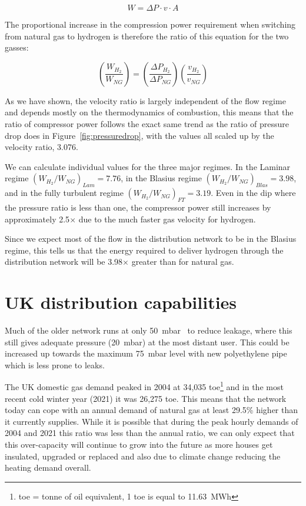 \documentclass[5p]{elsarticle} %
\begin{document}
\begin{equation}
\label{eqn:power}
 W = \Delta P \cdot v \cdot A 
\end{equation}

The proportional increase in the compression power requirement when switching from natural gas to hydrogen is therefore the ratio of this equation for the two gasses:

\begin{equation}
\label{eqn:powerratio}
    \left(\frac{W_{H_2}}{W_{NG}}\right) =
    \left(\frac{\Delta P_{H_2}}{\Delta P_{NG}}\right)
    \left(\frac{v_{H_2}}{v_{NG}}\right)
\end{equation}

As we have shown, the velocity ratio is largely independent of the flow regime and depends mostly on the thermodynamics of combustion, this means that the ratio of compressor power follows the exact same trend as the ratio of pressure drop does in Figure~\ref{fig:pressuredrop}, with the values all scaled up by the velocity ratio, 3.076.

We can calculate individual values for the three major regimes.
In the Laminar regime $(W_{H_2}/W_{NG})_{Lam} = 7.76$, in the Blasius regime $(W_{H_2}/W_{NG})_{Blas} = 3.98$, and in the fully turbulent regime $(W_{H_2}/W_{NG})_{FT} = 3.19$.
Even in the dip where the pressure ratio is less than one, the compressor power still increases by approximately 2.5$\times$ due to the much faster gas velocity for hydrogen.

Since we expect most of the flow in the distribution network to be in the Blasius regime, this tells us that the energy required to deliver hydrogen through the distribution network will be 3.98$\times$ greater than for natural gas.

\section{UK distribution capabilities}
\label{sec:distcapable}

Much of the older network runs at only 50~mbar~\cite{ARUP2023} to reduce leakage, where this still gives adequate pressure (20~mbar) at the most distant user. 
This could be increased up towards the maximum 75~mbar level with new polyethylene pipe which is less prone to leaks\citep{ARUP2023}. 

The UK domestic gas demand\citep{DESNZ2023a} peaked in 2004 at 34,035 toe\footnote{toe = tonne of oil equivalent, 1 toe is equal to 11.63~MWh} and in the most recent cold winter year (2021) it was 26,275 toe. 
This means that the network today can cope with an annual demand of natural gas at least 29.5\% higher than it currently supplies.
While it is possible that during the peak hourly demands of 2004 and 2021 this ratio was less than the annual ratio, we can only expect that this over-capacity will continue to grow into the future as more houses get insulated, upgraded or replaced and also due to climate change reducing the heating demand overall\citep{Christidis2021}. 
\end{document}
